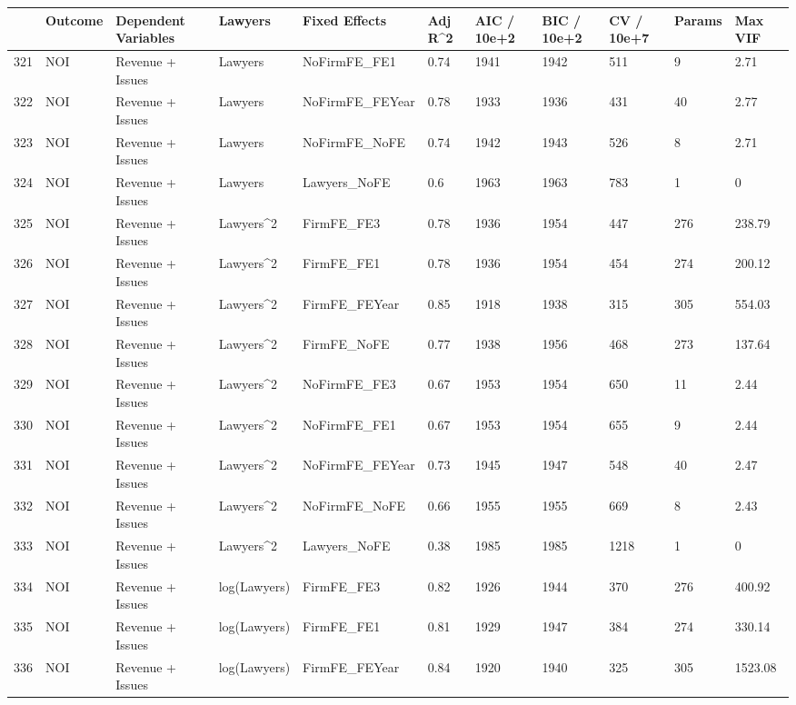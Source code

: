 \begin{table}[ht]
\centering
\begin{tabular}{rllllllllll}
  \hline
 & Outcome & Dependent Variables & Lawyers & Fixed Effects & Adj R^2 & AIC / 10e+2 & BIC / 10e+2 & CV / 10e+7 & Params & Max VIF \\ 
  \hline
321 & NOI & Revenue + Issues & Lawyers & NoFirmFE\_FE1 & 0.74 & 1941 & 1942 & 511 & 9 & 2.71 \\ 
  322 & NOI & Revenue + Issues & Lawyers & NoFirmFE\_FEYear & 0.78 & 1933 & 1936 & 431 & 40 & 2.77 \\ 
  323 & NOI & Revenue + Issues & Lawyers & NoFirmFE\_NoFE & 0.74 & 1942 & 1943 & 526 & 8 & 2.71 \\ 
  324 & NOI & Revenue + Issues & Lawyers & Lawyers\_NoFE & 0.6 & 1963 & 1963 & 783 & 1 & 0 \\ 
  325 & NOI & Revenue + Issues & Lawyers^2 & FirmFE\_FE3 & 0.78 & 1936 & 1954 & 447 & 276 & 238.79 \\ 
  326 & NOI & Revenue + Issues & Lawyers^2 & FirmFE\_FE1 & 0.78 & 1936 & 1954 & 454 & 274 & 200.12 \\ 
  327 & NOI & Revenue + Issues & Lawyers^2 & FirmFE\_FEYear & 0.85 & 1918 & 1938 & 315 & 305 & 554.03 \\ 
  328 & NOI & Revenue + Issues & Lawyers^2 & FirmFE\_NoFE & 0.77 & 1938 & 1956 & 468 & 273 & 137.64 \\ 
  329 & NOI & Revenue + Issues & Lawyers^2 & NoFirmFE\_FE3 & 0.67 & 1953 & 1954 & 650 & 11 & 2.44 \\ 
  330 & NOI & Revenue + Issues & Lawyers^2 & NoFirmFE\_FE1 & 0.67 & 1953 & 1954 & 655 & 9 & 2.44 \\ 
  331 & NOI & Revenue + Issues & Lawyers^2 & NoFirmFE\_FEYear & 0.73 & 1945 & 1947 & 548 & 40 & 2.47 \\ 
  332 & NOI & Revenue + Issues & Lawyers^2 & NoFirmFE\_NoFE & 0.66 & 1955 & 1955 & 669 & 8 & 2.43 \\ 
  333 & NOI & Revenue + Issues & Lawyers^2 & Lawyers\_NoFE & 0.38 & 1985 & 1985 & 1218 & 1 & 0 \\ 
  334 & NOI & Revenue + Issues & log(Lawyers) & FirmFE\_FE3 & 0.82 & 1926 & 1944 & 370 & 276 & 400.92 \\ 
  335 & NOI & Revenue + Issues & log(Lawyers) & FirmFE\_FE1 & 0.81 & 1929 & 1947 & 384 & 274 & 330.14 \\ 
  336 & NOI & Revenue + Issues & log(Lawyers) & FirmFE\_FEYear & 0.84 & 1920 & 1940 & 325 & 305 & 1523.08 \\ 

\end{tabular}
\end{table}
